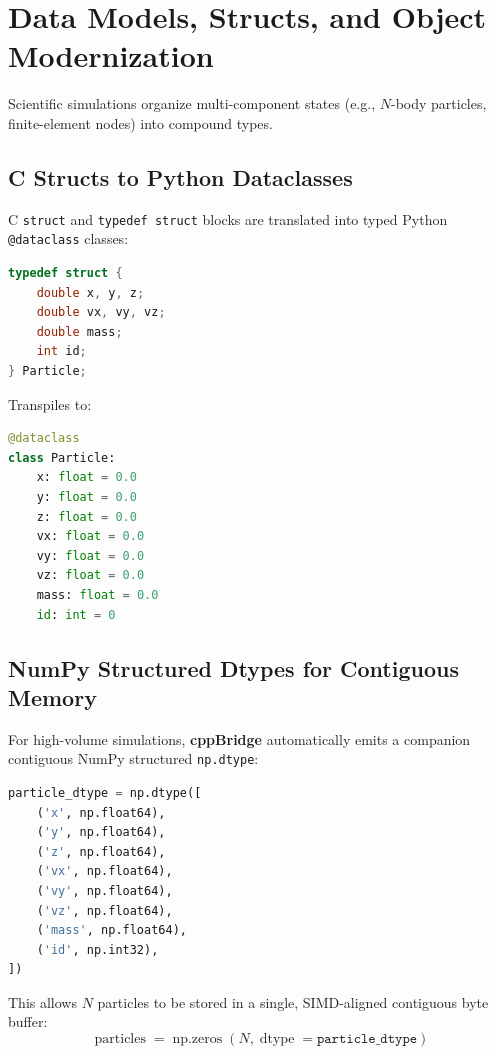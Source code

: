 \documentclass[11pt,a4paper]{article}
\theoremstyle{definition}
\begin{document}
\section{Data Models, Structs, and Object Modernization}

Scientific simulations organize multi-component states (e.g., $N$-body particles, finite-element nodes) into compound types.

\subsection{C Structs to Python Dataclasses}

C \texttt{struct} and \texttt{typedef struct} blocks are translated into typed Python \texttt{@dataclass} classes:
\begin{lstlisting}[language=C, caption={C Particle Definition}]
typedef struct {
    double x, y, z;
    double vx, vy, vz;
    double mass;
    int id;
} Particle;
\end{lstlisting}
Transpiles to:
\begin{lstlisting}[language=Python, caption={Python Dataclass Representation}]
@dataclass
class Particle:
    x: float = 0.0
    y: float = 0.0
    z: float = 0.0
    vx: float = 0.0
    vy: float = 0.0
    vz: float = 0.0
    mass: float = 0.0
    id: int = 0
\end{lstlisting}

\subsection{NumPy Structured Dtypes for Contiguous Memory}

For high-volume simulations, \textbf{cppBridge} automatically emits a companion contiguous NumPy structured \texttt{np.dtype}:
\begin{lstlisting}[language=Python, caption={NumPy Structured Dtype}]
particle_dtype = np.dtype([
    ('x', np.float64),
    ('y', np.float64),
    ('z', np.float64),
    ('vx', np.float64),
    ('vy', np.float64),
    ('vz', np.float64),
    ('mass', np.float64),
    ('id', np.int32),
])
\end{lstlisting}
This allows $N$ particles to be stored in a single, SIMD-aligned contiguous byte buffer:
\begin{equation}
    \operatorname{particles} = \operatorname{np.zeros}(N, \operatorname{dtype}=\texttt{particle\_dtype})
\end{equation}
\end{document}
